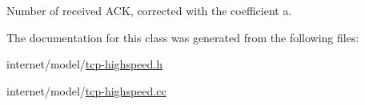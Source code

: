 Number of received A\+CK, corrected with the coefficient a. 



The documentation for this class was generated from the following files\+:\begin{DoxyCompactItemize}
\item 
internet/model/\hyperlink{tcp-highspeed_8h}{tcp-\/highspeed.\+h}\item 
internet/model/\hyperlink{tcp-highspeed_8cc}{tcp-\/highspeed.\+cc}\end{DoxyCompactItemize}
